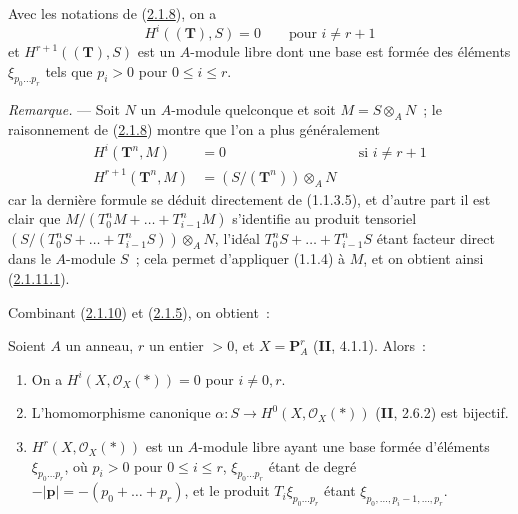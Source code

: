 \begin{corollary}[2.1.10]
\label{III.2.1.10-fr}
Avec les notations de (\hyperref[III.2.1.8-fr]{2.1.8}), on a
\begin{equation}
\label{III.2.1.10.1-fr}
\tag{2.1.10.1}
H^i((\mathbf T),S)=0\qquad\text{pour }i\neq r+1
\end{equation}
et $H^{r+1}((\mathbf T),S)$ est un $A$-module libre dont une base est formée
des éléments $\xi_{p_0\ldots p_r}$ tels que $p_i>0$ pour $0\leq i\leq r$.
\end{corollary}

\begin{env}[2.1.11]
\label{III.2.1.11-fr}
\emph{Remarque.} --- Soit $N$ un $A$-module quelconque et soit
$M=S\otimes_A N$~; le raisonnement de
(\hyperref[III.2.1.8-fr]{2.1.8}) montre que l'on a plus généralement
\begin{align}
\label{III.2.1.11.1-fr}
\tag{2.1.11.1}
H^i(\mathbf T^n,M)&=0 &&\text{si }i\neq r+1\\
\label{III.2.1.11.2-fr}
\tag{2.1.11.2}
H^{r+1}(\mathbf T^n,M)&=(S/(\mathbf T^n))\otimes_A N
\end{align}
car la dernière formule se déduit directement de (1.1.3.5), et d'autre
part il est clair que
$M/(T_0^nM+\ldots+T_{i-1}^nM)$
s'identifie au produit tensoriel
$(S/(T_0^nS+\ldots+T_{i-1}^nS))\otimes_A N$,
l'idéal $T_0^nS+\ldots+T_{i-1}^nS$ étant facteur direct dans le
$A$-module $S$~; cela permet d'appliquer (1.1.4) à $M$, et on obtient ainsi
(\hyperref[III.2.1.11.1-fr]{2.1.11.1}).
\end{env}

Combinant (\hyperref[III.2.1.10-fr]{2.1.10}) et
(\hyperref[III.2.1.5-fr]{2.1.5}), on obtient~:

\begin{proposition}[2.1.12]
\label{III.2.1.12-fr}
Soient $A$ un anneau, $r$ un entier $>0$, et
$X=\mathbf P_A^r$ (\textbf{II}, 4.1.1). Alors~:
\begin{enumerate}
\item[{\rm(i)}] On a $H^i(X,\mathcal O_X(*))=0$ pour $i\neq0,r$.
\item[{\rm(ii)}] L'homomorphisme canonique
$\alpha:S\to H^0(X,\mathcal O_X(*))$ (\textbf{II}, 2.6.2) est bijectif.
\item[{\rm(iii)}] $H^r(X,\mathcal O_X(*))$ est un $A$-module libre ayant
une base formée d'éléments $\xi_{p_0\ldots p_r}$, où $p_i>0$ pour
$0\leq i\leq r$, $\xi_{p_0\ldots p_r}$ étant de degré
$-|\mathbf p|=-(p_0+\ldots+p_r)$, et le produit
$T_i\xi_{p_0\ldots p_r}$ étant
$\xi_{p_0,\ldots,p_i-1,\ldots,p_r}$.
\end{enumerate}
\end{proposition}


